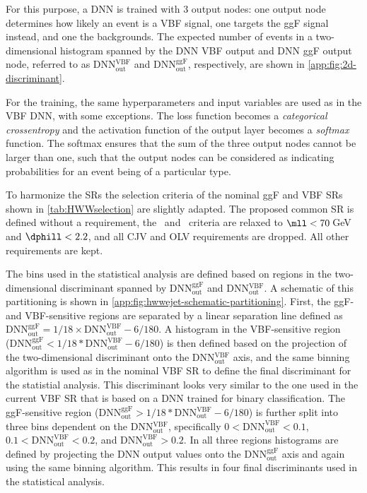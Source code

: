     For this purpose, a DNN is trained with 3 output nodes: one output node determines how likely an event is a VBF signal, one targets the ggF signal instead, and one the backgrounds.
    The expected number of events in a two-dimensional histogram spanned by the DNN VBF output and DNN ggF output node, referred to as DNN$_\mathrm{out}^\mathrm{VBF}$ and DNN$_\mathrm{out}^\mathrm{ggF}$, respectively, are shown in \cref{app:fig:2d-discriminant}.

    For the training, the same hyperparameters and input variables are used as in the VBF DNN, with some exceptions. The loss function becomes a \emph{categorical crossentropy} and the activation function of the output layer becomes a \emph{softmax} function.
    The softmax ensures that the sum of the three output nodes cannot be larger than one, such that the output nodes can be considered as indicating probabilities for an event being of a particular type.

    To harmonize the \TwoJet SRs the selection criteria of the nominal ggF \TwoJet and VBF \TwoJet SRs shown in \cref{tab:HWWselection} are slightly adapted.
    The proposed common \TwoJet SR is defined without a \pTmiss requirement, the \mll\ and \dphill\ criteria are relaxed to $\mll < 70\,$GeV and $\dphill < 2.2$, and all CJV and OLV requirements are dropped. All other requirements are kept.

    The bins used in the statistical analysis are defined based on regions in the two-dimensional discriminant spanned by DNN$_\mathrm{out}^\mathrm{ggF}$ and DNN$_\mathrm{out}^\mathrm{VBF}$. A schematic of this partitioning is shown in \cref{app:fig:hwwejet-schematic-partitioning}.
    First, the ggF- and VBF-sensitive regions are separated by a linear separation line defined as DNN$_\mathrm{out}^\mathrm{ggF}= 1/18 \times \text{DNN}_\mathrm{out}^\mathrm{VBF} - 6/180$.
    A histogram in the VBF-sensitive region (DNN$_\mathrm{out}^\mathrm{ggF} < 1/18 * \text{DNN}_\mathrm{out}^\mathrm{VBF} - 6/180$) is then defined based on the projection of the two-dimensional discriminant onto the DNN$_\mathrm{out}^\mathrm{VBF}$ axis, and the same binning algorithm is used as in the nominal VBF SR to define the final discriminant for the statistial analysis. This discriminant looks very similar to the one used in the current VBF \TwoJet SR that is based on a DNN trained for binary classification.
    The ggF-sensitive region (DNN$_\mathrm{out}^\mathrm{ggF}> 1/18 * \text{DNN}_\mathrm{out}^\mathrm{VBF} - 6/180$) is further split into three bins dependent on the DNN$_\mathrm{out}^\mathrm{VBF}$, specifically $0 < \text{DNN}_\mathrm{out}^\mathrm{VBF} < 0.1$, $0.1 < \text{DNN}_\mathrm{out}^\mathrm{VBF} < 0.2$, and $\text{DNN}_\mathrm{out}^\mathrm{VBF} > 0.2$.
    In all three regions histograms are defined by projecting the DNN output values onto the DNN$_\mathrm{out}^\mathrm{ggF}$ axis and again using the same binning algorithm.
    This results in four final discriminants used in the statistical analysis.

